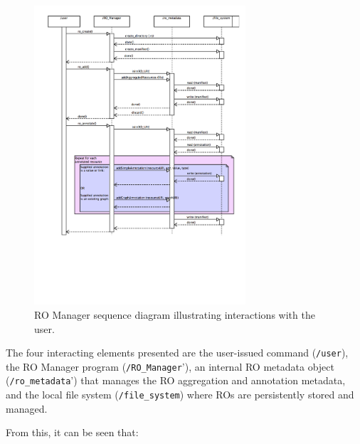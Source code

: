 \begin{figure}
\begin{center}
\includegraphics[width=0.7\textwidth]{Figures/RO_Manager_seq.png}
\end{center}
\caption{RO Manager sequence diagram illustrating interactions with the user.}
\label{fig:romanagersequencediagram}
\end{figure}


The four interacting elements presented are the user-issued command (\texttt{/user}), the RO Manager program (\texttt{/RO\_Manager}'), an internal RO metadata object (\texttt{/ro\_metadata}') that manages the RO aggregation and annotation metadata, and the local file system (\texttt{/file\_system}) where ROs are persistently stored and managed.

From this, it can be seen that:

